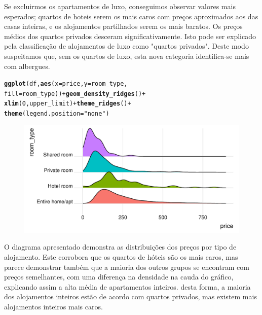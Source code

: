 \documentclass[justified, 11pt]{scrartcl}\usepackage[]{graphicx}\usepackage[]{xcolor}
\makeatletter
\def\maxwidth{ %
  \ifdim\Gin@nat@width>\linewidth
    \linewidth
  \else
    \Gin@nat@width
  \fi
}
\newcommand{\hlnum}[1]{\textcolor[rgb]{0.686,0.059,0.569}{#1}}%
\newcommand{\hlstr}[1]{\textcolor[rgb]{0.192,0.494,0.8}{#1}}%
\newcommand{\hlopt}[1]{\textcolor[rgb]{0,0,0}{#1}}%
\newcommand{\hlstd}[1]{\textcolor[rgb]{0.345,0.345,0.345}{#1}}%
\newcommand{\hlkwc}[1]{\textcolor[rgb]{0.333,0.667,0.333}{#1}}%
\newcommand{\hlkwd}[1]{\textcolor[rgb]{0.737,0.353,0.396}{\textbf{#1}}}%
\newenvironment{kframe}{%
 \def\at@end@of@kframe{}%
 \ifinner\ifhmode%
  \def\at@end@of@kframe{\end{minipage}}%
  \begin{minipage}{\columnwidth}%
 \fi\fi%
 \def\FrameCommand##1{\hskip\@totalleftmargin \hskip-\fboxsep
 \colorbox{shadecolor}{##1}\hskip-\fboxsep
     \hskip-\linewidth \hskip-\@totalleftmargin \hskip\columnwidth}%
 \MakeFramed {\advance\hsize-\width
   \@totalleftmargin\z@ \linewidth\hsize
   \@setminipage}}%
 {\par\unskip\endMakeFramed%
 \at@end@of@kframe}
\newenvironment{knitrout}{}{} %
\makeatother
\begin{document}
Se excluirmos os apartamentos de luxo, conseguimos observar valores mais esperados; quartos de hoteis serem os mais caros com preços aproximados aos das casas inteiras, e os alojamentos partilhados serem os mais baratos. Os preços médios dos quartos privados desceram significativamente. Isto pode ser explicado pela classificação de alojamentos de luxo como "quartos privados". Deste modo suspeitamos que, sem os quartos de luxo, esta nova categoria identifica-se mais com albergues.\\

\begin{knitrout}
\color{fgcolor}\begin{kframe}
\begin{alltt}
\hlkwd{ggplot}\hlstd{(df,} \hlkwd{aes}\hlstd{(}\hlkwc{x} \hlstd{= price,} \hlkwc{y} \hlstd{= room_type,}
    \hlkwc{fill} \hlstd{= room_type))} \hlopt{+} \hlkwd{geom_density_ridges}\hlstd{()} \hlopt{+}
    \hlkwd{xlim}\hlstd{(}\hlnum{0}\hlstd{, upper_limit)} \hlopt{+} \hlkwd{theme_ridges}\hlstd{()} \hlopt{+}
    \hlkwd{theme}\hlstd{(}\hlkwc{legend.position} \hlstd{=} \hlstr{"none"}\hlstd{)}
\end{alltt}


{\ttfamily\noindent\itshape\color{messagecolor}{\#\# Picking joint bandwidth of 24.6}}\end{kframe}\begin{figure}
\includegraphics[width=\maxwidth]{figure/chunk-RoomTypesPrice-1} \end{figure}

\end{knitrout}

O diagrama apresentado demonstra as distribuições dos preços por tipo de alojamento. Este corrobora que os quartos de hóteis são os mais caros, mas parece demonstrar também que a maioria dos outros grupos se encontram com preços semelhantes, com uma diferença na densidade na cauda do gráfico, explicando assim a alta média de apartamentos inteiros. desta forma, a maioria dos alojamentos inteiros estão de acordo com quartos privados, mas existem mais alojamentos inteiros mais caros.
\end{document}
